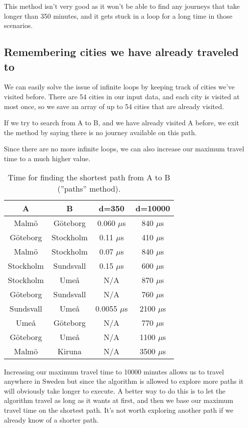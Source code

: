 \documentclass[a4paper,11pt]{article}
\begin{document}
This method isn't very good as it won't be able to find any journeys that take longer than 350 minutes, and it gets stuck in a loop for a long time in those scenarios.

\subsection*{Remembering cities we have already traveled to}

We can easily solve the issue of infinite loops by keeping track of cities we've visited before.
There are 54 cities in our input data, and each city is visited at most once, so we save an array of up to 54 cities that are already visited.

If we try to search from A to B, and we have already visited A before, we exit the method by saying there is no journey available on this path.

Since there are no more infinite loops, we can also increase our maximum travel time to a much higher value.

\begin{table}[H]
\centering
\begin{tabular}{|c|c|c|c|}
\hline
\textbf{A} & \textbf{B} & \textbf{d=350} & \textbf{d=10000} \\
\hline
	Malmö & Göteborg & 0.060 $\mu$s & 840 $\mu$s \\
	Göteborg & Stockholm & 0.11 $\mu$s & 410 $\mu$s \\
	Malmö & Stockholm & 0.07 $\mu$s & 840 $\mu$s \\
	Stockholm & Sundsvall & 0.15 $\mu$s & 600 $\mu$s \\
	Stockholm & Umeå & N/A & 870 $\mu$s \\
	Göteborg & Sundsvall & N/A & 760 $\mu$s \\
	Sundsvall & Umeå & 0.0055 $\mu$s & 2100 $\mu$s \\
	Umeå & Göteborg & N/A & 770 $\mu$s \\
	Göteborg & Umeå & N/A & 1100 $\mu$s \\
	Malmö & Kiruna & N/A & 3500 $\mu$s \\
\hline
\end{tabular}
\caption{Time for finding the shortest path from A to B (''paths'' method).}
\label{tab:table2}
\end{table}

Increasing our maximum travel time to 10000 minutes allows us to travel anywhere in Sweden but since the algorithm is allowed to explore more paths it will obviously take longer to execute.
A better way to do this is to let the algorithm travel as long as it wants at first, and then we base our maximum travel time on the shortest path. It's not worth exploring another path if we already know of a shorter path.
\end{document}
